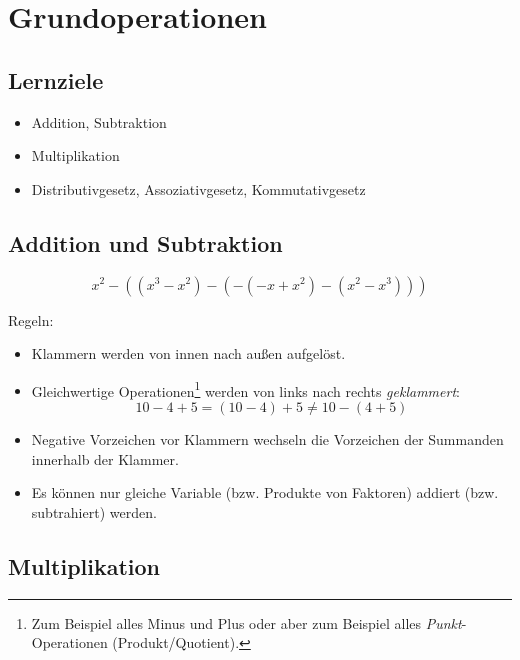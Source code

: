 \newpage
\section{Grundoperationen}

\subsection*{Lernziele}
\begin{itemize}
\item Addition, Subtraktion
\item Multiplikation
\item Distributivgesetz,
  Assoziativgesetz,
  Kommutativgesetz
\end{itemize}


\subsection{Addition und Subtraktion}
\begin{beispiel}{}{}
  $$x^2-((x^3-x^2)-(-(-x+x^2)-(x^2-x^3)))$$
\end{beispiel}

Regeln:
\begin{itemize}
\item Klammern werden von innen nach außen aufgelöst.
\item Gleichwertige Operationen\footnote{Zum Beispiel alles Minus und Plus oder aber zum Beispiel alles \textit{Punkt}-Operationen (Produkt/Quotient).} werden von links nach rechts \textit{geklammert}:
  $$10-4+5 = (10-4) + 5 \ne 10-(4+5)$$
\item Negative Vorzeichen vor Klammern wechseln die Vorzeichen der
      Summanden innerhalb der Klammer.
\item Es können nur gleiche Variable (bzw. Produkte von Faktoren)
      addiert (bzw. subtrahiert) werden.
\end{itemize}

\newpage
\subsection{Multiplikation}

